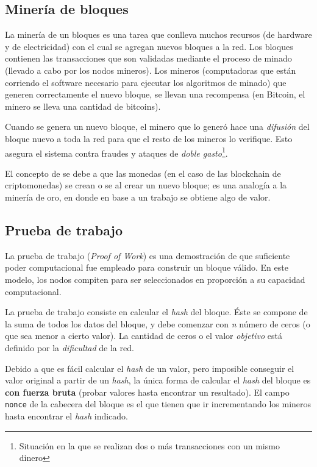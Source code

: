 \subsection{Minería de bloques}

La minería de un bloques es una tarea que conlleva muchos recursos (de hardware y de electricidad) con el cual se agregan nuevos bloques a la red. Los bloques contienen las transacciones que son validadas mediante el proceso de minado (llevado a cabo por los nodos mineros). Los mineros (computadoras que están corriendo el software necesario para ejecutar los algoritmos de minado) que generen correctamente el nuevo bloque, se llevan una recompensa (en Bitcoin, el minero se lleva una cantidad de bitcoins). 

Cuando se genera un nuevo bloque, el minero que lo generó hace una \emph{difusión} del bloque nuevo a toda la red para que el resto de los mineros lo verifique. Esto asegura el sistema contra fraudes y ataques de \emph{doble gasto}\footnote{Situación en la que se realizan dos o más transacciones con un mismo dinero}. 

El concepto de  se debe a que las monedas (en el caso de las blockchain de criptomonedas) se crean o se  al crear un nuevo bloque; es una analogía a la minería de oro, en donde en base a un trabajo se obtiene algo de valor.

\subsection{Prueba de trabajo}

La prueba de trabajo (\emph{Proof of Work}) es una demostración de que suficiente poder computacional fue empleado para construir un bloque válido. En este modelo, los nodos compiten para ser seleccionados en proporción a su capacidad computacional.

La prueba de trabajo consiste en calcular el \emph{hash} del bloque. Éste se compone de la suma de todos los datos del bloque, y debe comenzar con \emph{n} número de ceros (o que sea menor a cierto valor). La cantidad de ceros o el valor \emph{objetivo} está definido por la \emph{dificultad} de la red.     

Debido a que es fácil calcular el \emph{hash} de un valor, pero imposible conseguir el valor original a partir de un \emph{hash}, la única forma de calcular el \emph{hash} del bloque es \textbf{con fuerza bruta} (probar valores hasta encontrar un resultado). El campo \texttt{nonce} de la cabecera del bloque es el que tienen que ir incrementando los mineros hasta encontrar el \emph{hash} indicado.

